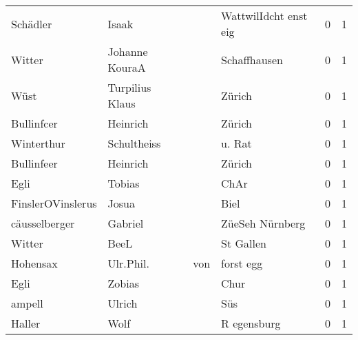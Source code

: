 \begin{center}
\begin{tiny}
\begin{longtabu}{llllrr}
                 Schädler &                              Isaak &             &                       WattwilIdcht enst eig &          0 &         1 \\
                   Witter &                     Johanne KouraA &             &                                Schaffhausen &          0 &         1 \\
                     Wüst &                    Turpilius Klaus &             &                                      Zürich &          0 &         1 \\
               Bullinfcer &                           Heinrich &             &                                      Zürich &          0 &         1 \\
               Winterthur &                        Schultheiss &             &                                      u. Rat &          0 &         1 \\
               Bullinfeer &                           Heinrich &             &                                      Zürich &          0 &         1 \\
                     Egli &                             Tobias &             &                                        ChAr &          0 &         1 \\
        FinslerOVinslerus &                              Josua &             &                                        Biel &          0 &         1 \\
            cäusselberger &                            Gabriel &             &                             ZüeSeh Nürnberg &          0 &         1 \\
                   Witter &                               BeeL &             &                                   St Gallen &          0 &         1 \\
                 Hohensax &                          Ulr.Phil. &         von &                                   forst egg &          0 &         1 \\
                     Egli &                             Zobias &             &                                        Chur &          0 &         1 \\
                   ampell &                             Ulrich &             &                                         Süs &          0 &         1 \\
                   Haller &                               Wolf &             &                                 R egensburg &          0 &         1 \\

\end{longtabu}
\end{tiny}
\end{center}
